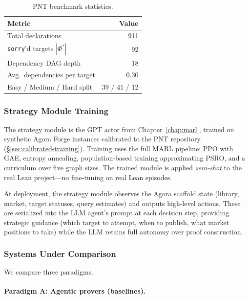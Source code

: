 \begin{table}[ht]
\centering
\caption{PNT benchmark statistics.}
\label{tab:pnt-stats}
\begin{tabular}{lr}
\toprule
\textbf{Metric} & \textbf{Value} \\
\midrule
Total declarations & 911 \\
\texttt{sorry}'d targets $|\Phi^*|$ & 92 \\
Dependency DAG depth & 18 \\
Avg.\ dependencies per target & 0.30 \\
Easy / Medium / Hard split & 39 / 41 / 12 \\
\bottomrule
\end{tabular}
\end{table}


\subsubsection{Strategy Module Training}\label{sec:strategy-training}

The strategy module is the GPT actor from Chapter~\ref{chap:marl}, trained on synthetic Agora Forge instances calibrated to the PNT repository (\S\ref{sec:calibrated-training}). Training uses the full MARL pipeline: PPO with GAE, entropy annealing, population-based training approximating PSRO, and a curriculum over five graph sizes. The trained module is applied \emph{zero-shot} to the real Lean project---no fine-tuning on real Lean episodes.

At deployment, the strategy module observes the Agora scaffold state (library, market, target statuses, query estimates) and outputs high-level actions. These are serialized into the LLM agent's prompt at each decision step, providing strategic guidance (which target to attempt, when to publish, what market positions to take) while the LLM retains full autonomy over proof construction.


\subsubsection{Systems Under Comparison}\label{sec:systems}

We compare three paradigms.

\paragraph{Paradigm A: Agentic provers (baselines).}

